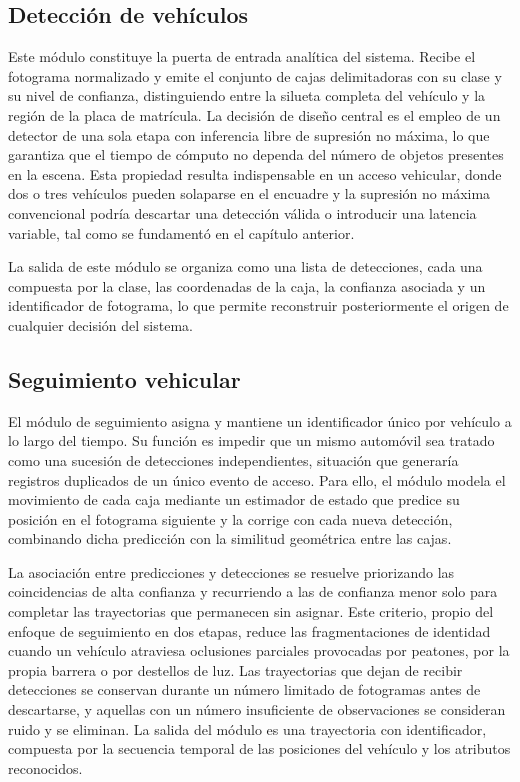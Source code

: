 \subsection{Detección de vehículos}

Este módulo constituye la puerta de entrada analítica del sistema. Recibe el
fotograma normalizado y emite el conjunto de cajas delimitadoras con su clase y
su nivel de confianza, distinguiendo entre la silueta completa del vehículo y la
región de la placa de matrícula. La decisión de diseño central es el empleo de
un detector de una sola etapa con inferencia libre de supresión no máxima, lo
que garantiza que el tiempo de cómputo no dependa del número de objetos
presentes en la escena. Esta propiedad resulta indispensable en un acceso
vehicular, donde dos o tres vehículos pueden solaparse en el encuadre y la
supresión no máxima convencional podría descartar una detección válida o
introducir una latencia variable, tal como se fundamentó en el capítulo
anterior.

La salida de este módulo se organiza como una lista de detecciones, cada una
compuesta por la clase, las coordenadas de la caja, la confianza asociada y un
identificador de fotograma, lo que permite reconstruir posteriormente el origen
de cualquier decisión del sistema.

\subsection{Seguimiento vehicular}

El módulo de seguimiento asigna y mantiene un identificador único por vehículo a
lo largo del tiempo. Su función es impedir que un mismo automóvil sea tratado
como una sucesión de detecciones independientes, situación que generaría
registros duplicados de un único evento de acceso. Para ello, el módulo modela
el movimiento de cada caja mediante un estimador de estado que predice su
posición en el fotograma siguiente y la corrige con cada nueva detección,
combinando dicha predicción con la similitud geométrica entre las cajas.

La asociación entre predicciones y detecciones se resuelve priorizando las
coincidencias de alta confianza y recurriendo a las de confianza menor solo para
completar las trayectorias que permanecen sin asignar. Este criterio, propio del
enfoque de seguimiento en dos etapas, reduce las fragmentaciones de identidad
cuando un vehículo atraviesa oclusiones parciales provocadas por peatones, por
la propia barrera o por destellos de luz. Las trayectorias que dejan de recibir
detecciones se conservan durante un número limitado de fotogramas antes de
descartarse, y aquellas con un número insuficiente de observaciones se
consideran ruido y se eliminan. La salida del módulo es una trayectoria con
identificador, compuesta por la secuencia temporal de las posiciones del
vehículo y los atributos reconocidos.

